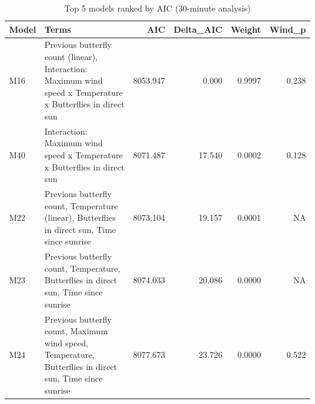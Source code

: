 \begin{table}

\caption{Top 5 models ranked by AIC (30-minute analysis)}
\centering
\begin{tabular}[t]{llrrrr}
\toprule
Model & Terms & AIC & Delta_AIC & Weight & Wind_p\\
\midrule
M16 & Previous butterfly count (linear), Interaction: Maximum wind speed x Temperature x Butterflies in direct sun & 8053.947 & 0.000 & 0.9997 & 0.238\\
M40 & Interaction: Maximum wind speed x Temperature x Butterflies in direct sun & 8071.487 & 17.540 & 0.0002 & 0.128\\
M22 & Previous butterfly count, Temperature (linear), Butterflies in direct sun, Time since sunrise & 8073.104 & 19.157 & 0.0001 & NA\\
M23 & Previous butterfly count, Temperature, Butterflies in direct sun, Time since sunrise & 8074.033 & 20.086 & 0.0000 & NA\\
M24 & Previous butterfly count, Maximum wind speed, Temperature, Butterflies in direct sun, Time since sunrise & 8077.673 & 23.726 & 0.0000 & 0.522\\
\bottomrule
\end{tabular}
\end{table}
